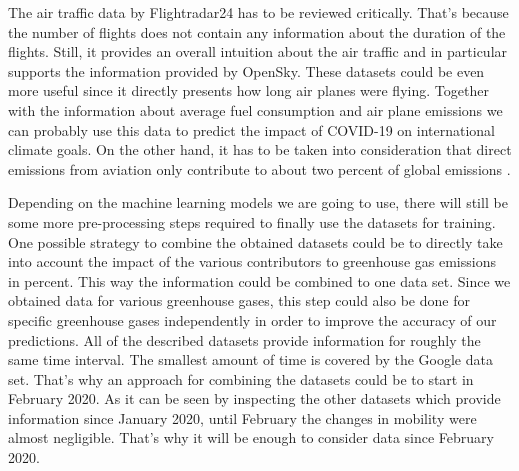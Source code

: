 The air traffic data by Flightradar24 has to be reviewed critically. That's because the number of flights does not contain any information about the duration of the flights. Still, it provides an overall intuition about the air traffic and in particular supports the information provided by OpenSky. These datasets could be even more useful since it directly presents how long air planes were flying. Together with the information about average fuel consumption and air plane emissions we can probably use this data to predict the impact of COVID-19 on international climate goals. On the other hand, it has to be taken into consideration that direct emissions from aviation only contribute to about two percent of global emissions \cite{EC_emissions}.

Depending on the machine learning models we are going to use, there will still be some more pre-processing steps required to finally use the datasets for training. One possible strategy to combine the obtained datasets could be to directly take into account the impact of the various contributors to greenhouse gas emissions in percent. This way the information could be combined to one data set. Since we obtained data for various greenhouse gases, this step could also be done for specific greenhouse gases independently in order to improve the accuracy of our predictions. All of the described datasets provide information for roughly the same time interval. The smallest amount of time is covered by the Google data set. That's why an approach for combining the datasets could be to start in February 2020. As it can be seen by inspecting the other datasets which provide information since January 2020, until February the changes in mobility were almost negligible. That's why it will be enough to consider data since February 2020.

